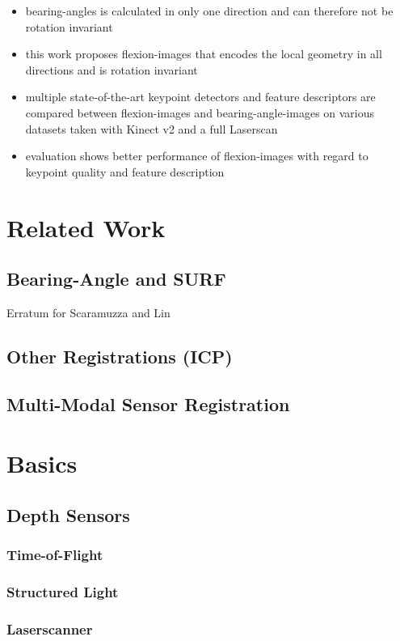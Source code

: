 \begin{itemize}
    \item \Glspl{bearing-angle} is calculated in only one direction and can therefore not be rotation invariant
    \item this work proposes \Glspl{flexion-image} that encodes the local geometry in all directions and is rotation invariant
    \item multiple state-of-the-art keypoint detectors and feature descriptors are compared between \Glspl{flexion-image} and \Glspl{bearing-angle-image} on various datasets taken with Kinect v2 and a full Laserscan
    \item evaluation shows better performance of \Glspl{flexion-image} with regard to keypoint quality and feature description
\end{itemize}


\section{Related Work}

\subsection{Bearing-Angle and SURF}
Erratum for Scaramuzza and Lin
\subsection{Other Registrations (ICP)}
\subsection{Multi-Modal Sensor Registration}

\section{Basics}

\subsection{Depth Sensors}
\subsubsection{Time-of-Flight}
\subsubsection{Structured Light}
\subsubsection{Laserscanner}

